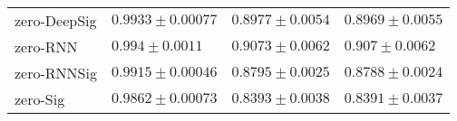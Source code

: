 \begin{tabular}{llll}
zero-DeepSig   &                           $ 0.9933 \pm 0.00077 $ &                           $ 0.8977 \pm 0.0054 $ &                           $ 0.8969 \pm 0.0055 $ \\
zero-RNN       &                             $ 0.994 \pm 0.0011 $ &                           $ 0.9073 \pm 0.0062 $ &                            $ 0.907 \pm 0.0062 $ \\
zero-RNNSig    &                           $ 0.9915 \pm 0.00046 $ &                           $ 0.8795 \pm 0.0025 $ &                           $ 0.8788 \pm 0.0024 $ \\
zero-Sig       &                           $ 0.9862 \pm 0.00073 $ &                           $ 0.8393 \pm 0.0038 $ &                           $ 0.8391 \pm 0.0037 $ \\
\bottomrule
\end{tabular}
